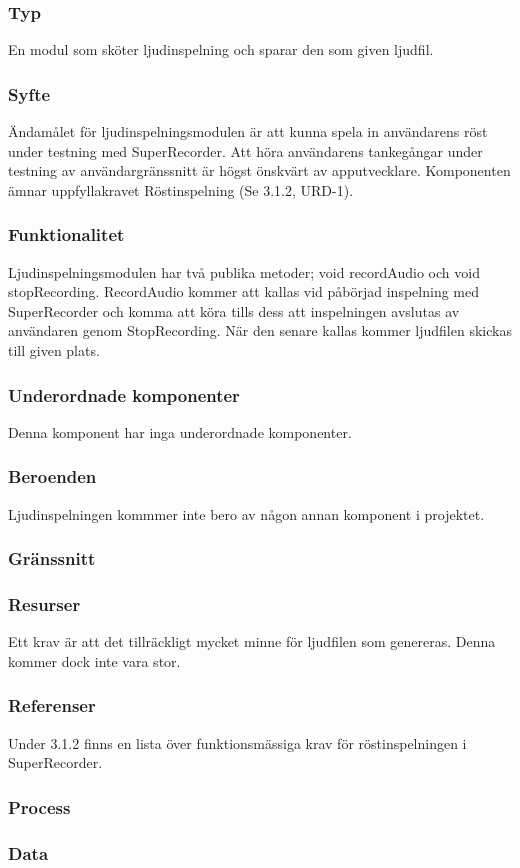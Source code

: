 \subsubsection{Typ}
En modul som sköter ljudinspelning och sparar den som given ljudfil.

\subsubsection{Syfte}
Ändamålet för ljudinspelningsmodulen är att kunna spela in användarens röst under testning med SuperRecorder. Att höra användarens tankegångar under testning av användargränssnitt är högst önskvärt av apputvecklare. Komponenten ämnar uppfyllakravet Röstinspelning (Se 3.1.2, URD-1).

\subsubsection{Funktionalitet}
Ljudinspelningsmodulen har två publika metoder; void recordAudio och void stopRecording. RecordAudio kommer att kallas vid påbörjad inspelning med SuperRecorder och komma att köra tills dess att inspelningen avslutas av användaren genom StopRecording. När den senare kallas kommer ljudfilen skickas till given plats.

\subsubsection{Underordnade komponenter}
Denna komponent har inga underordnade komponenter.

\subsubsection{Beroenden}
Ljudinspelningen kommmer inte bero av någon annan komponent i projektet.

\subsubsection{Gränssnitt}

\subsubsection{Resurser}
Ett krav är att det tillräckligt mycket minne för ljudfilen som genereras. Denna kommer dock inte vara stor.

\subsubsection{Referenser}
Under 3.1.2 finns en lista över funktionsmässiga krav för röstinspelningen i SuperRecorder.

\subsubsection{Process}

\subsubsection{Data}
